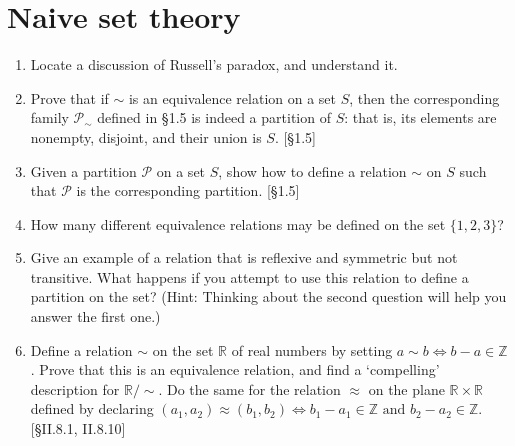 \section{Naive set theory}
\begin{enumerate}
    \item Locate a discussion of Russell's paradox, and understand it.
    \item Prove that if $\sim$ is an equivalence relation on a set $S$, then the corresponding family $\mathcal{P}_{\sim}$ defined in \S1.5 is indeed a partition of $S$: that is, its elements are nonempty, disjoint, and their union is $S$. [\S1.5]

          \begin{solution}
            \lipsum[1]
          \end{solution}

    \item Given a partition $\mathcal{P}$ on a set $S$, show how to define a relation $\sim$ on $S$ such that $\mathcal{P}$ is the corresponding partition. [\S1.5]
    \item How many different equivalence relations may be defined on the set $\{1, 2, 3\}$?
    \item Give an example of a relation that is reflexive and symmetric but not transitive. What happens if you attempt to use this relation to define a partition on the set? (Hint: Thinking about the second question will help you answer the first one.)
    \item Define a relation $\sim$ on the set $\mathbb{R}$ of real numbers by setting $a \sim b \iff b-a \in \mathbb{Z}$. Prove that this is an equivalence relation, and find a `compelling' description for $\mathbb{R}/\sim$. Do the same for the relation $\approx$ on the plane $\mathbb{R} \times \mathbb{R}$ defined by declaring $(a_1, a_2) \approx (b_1, b_2) \iff b_1 - a_1 \in \mathbb{Z} \text{ and } b_2 - a_2 \in \mathbb{Z}$. [\S II.8.1, II.8.10]
\end{enumerate}
